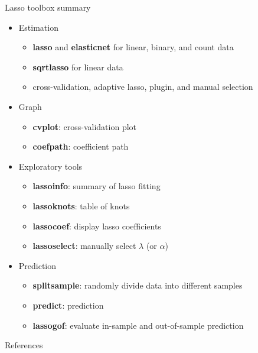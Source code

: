 \documentclass{beamer}
\begin{document}
\begin{frame}{Lasso toolbox summary}
	\begin{itemize}
		\item Estimation
		\begin{itemize}
			\item \textbf{lasso} and \textbf{elasticnet} for linear, binary, and count data
			\item \textbf{sqrtlasso} for linear data
			\item cross-validation, adaptive lasso, plugin, and manual selection
		\end{itemize}
		\item Graph
		\begin{itemize}
			\item \textbf{cvplot}: cross-validation plot
			\item \textbf{coefpath}: coefficient path
		\end{itemize}
		\item Exploratory tools
		\begin{itemize}
			\item \textbf{lassoinfo}: summary of lasso fitting
			\item \textbf{lassoknots}: table of knots
			\item \textbf{lassocoef}: display lasso coefficients
			\item \textbf{lassoselect}: manually select $\lambda$ (or $\alpha$)
		\end{itemize}	
		\item Prediction
		\begin{itemize}
			\item \textbf{splitsample}: randomly divide data into different samples
			\item \textbf{predict}: prediction
			\item \textbf{lassogof}: evaluate in-sample and out-of-sample prediction
		\end{itemize}
	\end{itemize}
\end{frame}

\begin{frame}{References}
	
	
\end{frame}
\end{document}
